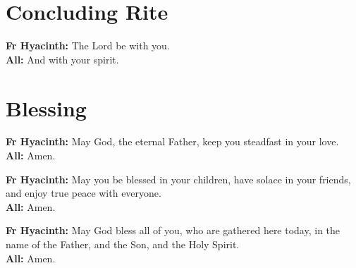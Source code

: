 \documentclass[12pt,landscape]{article}
\begin{document}
\begin{multicols}{2}
\columnbreak

\section*{Concluding Rite}
\textbf{Fr Hyacinth:} The Lord be with you.\\
\textbf{All:} And with your spirit.

\section*{Blessing}
\textbf{Fr Hyacinth:} May God, the eternal Father, keep you steadfast in your love.\\[0.5em]
\textbf{All:} Amen.

\textbf{Fr Hyacinth:} May you be blessed in your children, have solace in your friends, and enjoy true peace with everyone.\\[0.5em]
\textbf{All:} Amen.

\textbf{Fr Hyacinth:} May God bless all of you, who are gathered here today, in the name of the Father, and the Son, and the Holy Spirit.\\[0.5em]
\textbf{All:} Amen.

\end{multicols}
\end{document}
